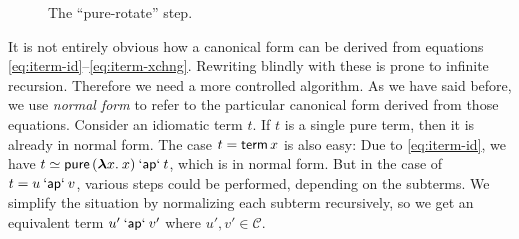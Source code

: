 \begin{figure}\centering
{}
\raisebox{10mm}{$\qquad\simeq\qquad$}
\raisebox{10mm}{$\qquad\simeq\qquad$}
\caption{The ``pure-rotate'' step.}
\label{fig:pure-rotate}
\end{figure}

It is not entirely obvious how a canonical form can be derived from equations
\eqref{eq:iterm-id}--\eqref{eq:iterm-xchng}.
Rewriting blindly with these is prone to infinite recursion.
Therefore we need a more controlled algorithm.
As we have said before, we use \emph{normal form} to refer to the particular
canonical form derived from those equations.
Consider an idiomatic term $t$.
If $t$ is a single pure term, then it is already in normal form.
The case $t = \operatorname{\mathsf{term}} x$ is also easy:
Due to \eqref{eq:iterm-id}, we have $t \simeq \operatorname{\mathsf{pure}}{({\boldsymbol\lambda} x.\>x)} \mathbin{\mathsf{`ap`}} t$,
which is in normal form.
But in the case of $t = u \mathbin{\mathsf{`ap`}} v$, various steps could be performed,
depending on the subterms.
We simplify the situation by normalizing each subterm recursively, so we get
an equivalent term $u' \mathbin{\mathsf{`ap`}} v'$ where $u',v' \in \mathcal{C}$.

